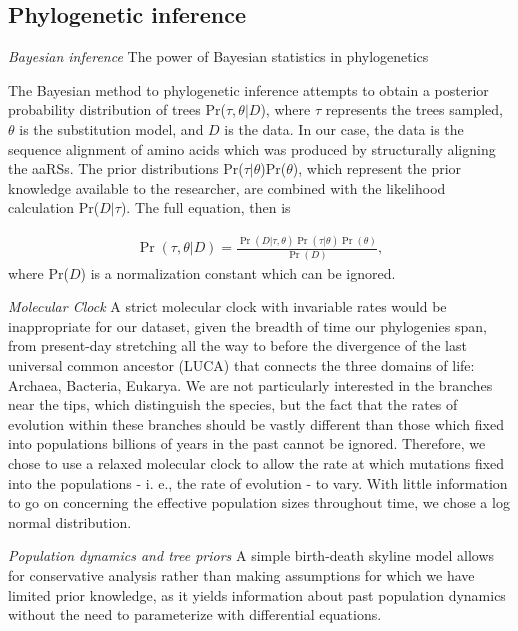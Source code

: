 \documentclass[10pt,letterpaper]{article}
\begin{document}
\subsection*{Phylogenetic inference}

\textit{Bayesian inference}
The power of Bayesian statistics in phylogenetics \cite{Huelsenbeck} \cite{HolderLewis}

The Bayesian method to phylogenetic inference attempts to obtain a posterior probability distribution of trees Pr($\tau,\theta|D$), where $\tau$ represents the trees sampled, $\theta$ is the substitution model, and $D$ is the data.  In our case, the data is the sequence alignment of amino acids which was produced by structurally aligning the aaRSs.
The prior distributions Pr($\tau|\theta$)Pr($\theta$), which represent the prior knowledge available to the researcher, are combined with the likelihood calculation Pr($D|\tau$).  The full equation, then is

\begin{eqnarray}
\Pr(\tau,\theta|D) = \frac{\Pr(D|\tau,\theta)\Pr(\tau|\theta)\Pr(\theta)}{\Pr(D)},
\label{eq:posterior}
\end{eqnarray}
where Pr($D$) is a normalization constant which can be ignored.



\textit{Molecular Clock}
A strict molecular clock with invariable rates would be inappropriate for our dataset, given the breadth of time our phylogenies span, from present-day stretching all the way to before the divergence of the last universal common ancestor (LUCA) that connects the three domains of life: Archaea, Bacteria, Eukarya. 
We are not particularly interested in the branches near the tips, which distinguish the species, but the fact that the rates of evolution within these branches should be vastly different than those which fixed into populations billions of years in the past cannot be ignored.  Therefore, we chose to use a 
relaxed molecular clock to allow the rate at which mutations fixed into the populations - i. e., the rate of evolution - to vary.  With little information to go on concerning the effective population sizes throughout time, we chose a log normal distribution. 

\textit{Population dynamics and tree priors}
A simple birth-death skyline model allows for conservative analysis rather than making assumptions for which we have limited prior knowledge, as it yields information about past population dynamics without the need to parameterize with differential equations. \cite{coalSky} \cite{BDSKY}
\end{document}
